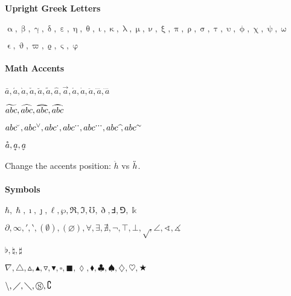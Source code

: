 \paragraph{Upright Greek Letters}
{\LARGE
    $ \upalpha, \upbeta, \upgamma, \updelta, \upepsilon, \upeta, \uptheta, \upiota, \upkappa, \uplambda, \upmu, 
    \upnu, \upxi, \uppi, \uprho, \upsigma, \uptau, \upupsilon, \upphi, \upchi, \uppsi, \upomega $

    $ \upvarepsilon, \upvartheta, \upvarpi, \upvarrho, \upvarsigma, \upvarphi $     %
}

\paragraph{Math Accents}
{\LARGE
    $ \bar{a}, \acute{a}, \grave{a}, \check{a}, \breve{a}, \tilde{a}, \hat{a}, \vec{a}, \mathring{a}, \dot{a}, \ddot{a}, 
    \ddddot{a}, \ddddot{a} $    %

    $ \widetilde{abc}, \widehat{abc}, 
    \widetriangle{abc}, \wideparen{abc} $       %

    $ abc\spbreve, abc\spcheck, abc\spdot, abc\spddot, abc\spdddot, abc\sphat, abc\sptilde $    %

    $ \accentset{*}{a}, \underaccent{*}{a}, \underaccent{\check}{a} $    %
}

Change the accents position: $ \ddot{h} $ vs $ \skew{-2}{\ddot}{h} $.

\paragraph{Symbols}
{\LARGE
    $ \hbar, \hslash, \imath, \jmath, \ell, \wp, \Re, \Im, \mho, \eth, \Finv, \Game, \Bbbk $
    
    $ \partial, \infty, \prime, \backprime, (\emptyset), (\varnothing), \forall, \exists, \nexists, 
    \neg, \top, \bot, \surd, \angle, \sphericalangle, \measuredangle $
    
    $ \flat, \natural, \sharp $
    
    $ \nabla, \triangle, \vartriangle, \blacktriangle, \triangledown, \blacktriangledown, \square, \blacksquare, \lozenge, \blacklozenge, 
    \clubsuit, \spadesuit, \diamondsuit, \heartsuit, \bigstar $

    $ \backslash, \diagup, \diagdown, \circledS, \complement $
}

